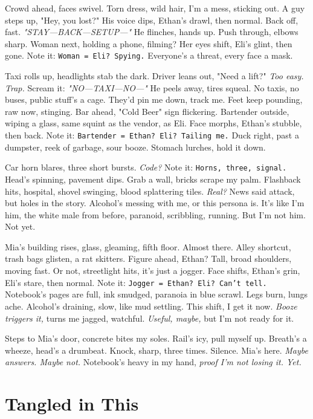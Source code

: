 \documentclass[12pt]{article}
\newcommand{\note}[1]{\texttt{#1}}
\begin{document}
Crowd ahead, faces swivel. Torn dress, wild hair, I’m a mess, sticking out. A guy steps up, "Hey, you lost?" His voice dips, \textnormal{Ethan}’s drawl, then normal. Back off, fast. \textit{"STAY—BACK—SETUP—"} He flinches, hands up. Push through, elbows sharp. Woman next, holding a phone, filming? Her eyes shift, \textnormal{Eli}’s glint, then gone. Note it: \note{Woman = Eli? Spying.} Everyone’s a threat, every face a mask.

Taxi rolls up, headlights stab the dark. Driver leans out, "Need a lift?" \textit{Too easy. Trap.} Scream it: \textit{"NO—TAXI—NO—"} He peels away, tires squeal. No taxis, no buses, public stuff’s a cage. They’d pin me down, track me. Feet keep pounding, raw now, stinging. Bar ahead, "Cold Beer" sign flickering. Bartender outside, wiping a glass, same squint as the vendor, as \textnormal{Eli}. Face morphs, \textnormal{Ethan}’s stubble, then back. Note it: \note{Bartender = Ethan? Eli? Tailing me.} Duck right, past a dumpster, reek of garbage, sour booze. Stomach lurches, hold it down.

Car horn blares, three short bursts. \textit{Code?} Note it: \note{Horns, three, signal.} Head’s spinning, pavement dips. Grab a wall, bricks scrape my palm. Flashback hits, hospital, shovel swinging, blood splattering tiles. \textit{Real?} News said attack, but holes in the story. Alcohol’s messing with me, or this persona is. It’s like I’m him, the white male from before, paranoid, scribbling, running. But I’m not him. Not yet.

\textnormal{Mia}’s building rises, glass, gleaming, fifth floor. Almost there. Alley shortcut, trash bags glisten, a rat skitters. Figure ahead, \textnormal{Ethan}? Tall, broad shoulders, moving fast. Or not, streetlight hits, it’s just a jogger. Face shifts, \textnormal{Ethan}’s grin, \textnormal{Eli}’s stare, then normal. Note it: \note{Jogger = Ethan? Eli? Can’t tell.} Notebook’s pages are full, ink smudged, paranoia in blue scrawl. Legs burn, lungs ache. Alcohol’s draining, slow, like mud settling. This shift, I get it now. \textit{Booze triggers it,} turns me jagged, watchful. \textit{Useful, maybe,} but I’m not ready for it.

Steps to \textnormal{Mia}’s door, concrete bites my soles. Rail’s icy, pull myself up. Breath’s a wheeze, head’s a drumbeat. Knock, sharp, three times. Silence. \textnormal{Mia}’s here. \textit{Maybe answers. Maybe not.} Notebook’s heavy in my hand, \textit{proof I’m not losing it. Yet.}

\section{Tangled in This}
\end{document}
